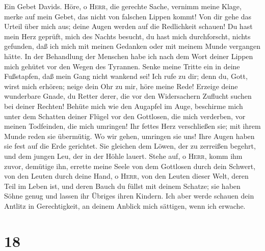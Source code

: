  Ein Gebet Davids. Höre, o \textsc{Herr}, die gerechte
Sache, vernimm meine Klage, merke auf mein Gebet, das nicht von falschen
Lippen kommt!  Von dir gehe das Urteil über mich aus;
deine Augen werden auf die Redlichkeit schauen!  Du hast
mein Herz geprüft, mich des Nachts besucht, du hast mich durchforscht,
nichts gefunden, daß ich mich mit meinen Gedanken oder mit meinem Munde
vergangen hätte.  In der Behandlung der Menschen habe ich
nach dem Wort deiner Lippen mich gehütet vor den Wegen des Tyrannen.
 Senke meine Tritte ein in deine Fußstapfen, daß mein Gang
nicht wankend sei!  Ich rufe zu dir; denn du, Gott, wirst
mich erhören; neige dein Ohr zu mir, höre meine Rede! 
Erzeige deine wunderbare Gnade, du Retter derer, die vor den
Widersachern Zuflucht suchen bei deiner Rechten!  Behüte
mich wie den Augapfel im Auge, beschirme mich unter dem Schatten deiner
Flügel  vor den Gottlosen, die mich verderben, vor meinen
Todfeinden, die mich umringen!  Ihr fettes Herz
verschließen sie; mit ihrem Munde reden sie übermütig. 
Wo wir gehen, umringen sie uns! Ihre Augen haben sie fest auf die Erde
gerichtet.  Sie gleichen dem Löwen, der zu zerreißen
begehrt, und dem jungen Leu, der in der Höhle lauert. 
Stehe auf, o \textsc{Herr}, komm ihm zuvor, demütige ihn, errette meine
Seele von dem Gottlosen durch dein Schwert,  von den
Leuten durch deine Hand, o \textsc{Herr}, von den Leuten dieser Welt,
deren Teil im Leben ist, und deren Bauch du füllst mit deinem Schatze;
sie haben Söhne genug und lassen ihr Übriges ihren Kindern.
 Ich aber werde schauen dein Antlitz in Gerechtigkeit, an
deinem Anblick mich sättigen, wenn ich erwache.

\hypertarget{section-17}{%
\section{18}\label{section-17}}

